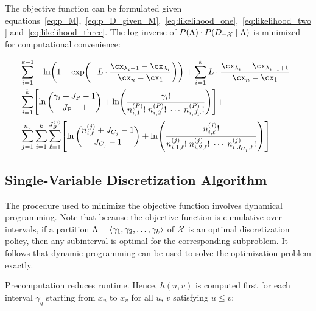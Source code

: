 The objective function can be formulated given equations~\ref{eq:p_M},~\ref{eq:p_D_given_M},~\ref{eq:likelihood_one},~\ref{eq:likelihood_two} and~\ref{eq:likelihood_three}.
The log-inverse of $P(\Lambda) \cdot P(D_{-\mathcal{X}} \mid \Lambda)$ is minimized for computational convenience:

\begin{equation}
\label{eq:opt_prob}
\begin{aligned}
  & \sum_{i=1}^{k-1}
   - \ln
    \paren{
      1 - \exp
      \paren{
        - L \cdot  \frac{
                         \cx_{\lambda_i +1} - \cx_{\lambda_i}
                       }{
                         \cx_n - \cx_1
                        }
      }
    }
      + \sum_{i=1}^{k}
      L \cdot \frac{\cx_{\lambda_{i}} - \cx_{\lambda_{i-1} + 1}}{\cx_n - \cx_1} + \\
  & \sum_{i=1}^{k} \brock{
  \ln{{\gamma_i + J_\text{P} - 1}\choose{J_\text{P} - 1}}
  +{ \ln \paren{
        \frac{
          {\gamma_i}!
        }{
          {n^{({P})}_{i,1}}! \; {n^{({P})}_{i,2}}! \; \cdots \; {n^{({P})}_{i,J_\text{P}}}!
        }
      }}
  } + \\
  & \sum_{j=1}^{n_c} \sum_{i=1}^k \sum_{\ell=1}^{J^{(j)}_{\bm{S}}} \brock{
  { \ln
          {{n^{(j)}_{i,\ell} + J_{C_j} - 1}\choose{J_{C_j}-1}}}
    +
    \ln \paren{ {
          \frac{
            {n^{(j)}_{i,\ell}}!
          }{
            {n^{(j)}_{i,1,\ell}!} \; {n^{(j)}_{i,2,\ell}!} \; \cdots \; {n^{(j)}_{i,J_{C_j},\ell}!}
          }
        }
        } }
\end{aligned}
\end{equation}



\subsection{Single-Variable Discretization Algorithm}
\label{subsec:algo}

The procedure used to minimize the objective function involves dynamical programming.
Note that because the objective function is cumulative over intervals, if a partition $\Lambda = \langle \gamma_1, \gamma_2, \ldots, \gamma_k \rangle$ of $\mathcal{X}$ is an optimal discretization policy, then any subinterval is optimal for the corresponding subproblem.
It follows that dynamic programming can be used to solve the optimization problem exactly.

Precomputation reduces runtime.
Hence, $h(u,v)$ is computed first for each interval $\gamma_q$ starting from $x_{u}$ to $x_{v}$ for all $u$, $v$ satisfying $u \leq v$:

